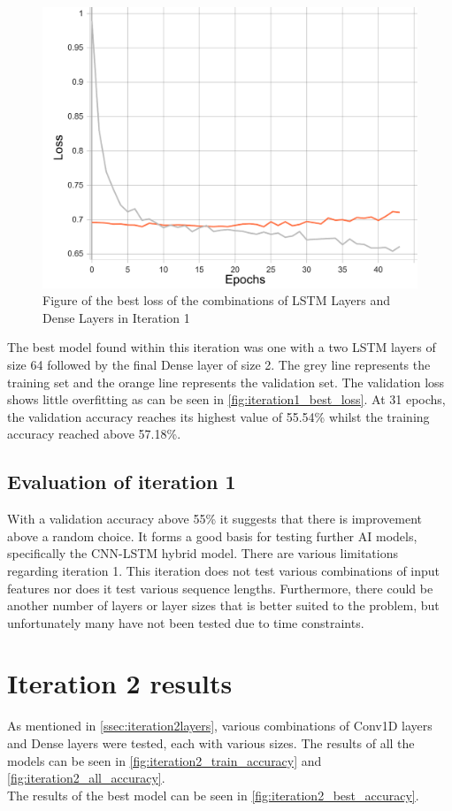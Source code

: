 \begin{figure}[ht]
    \centering
    \includegraphics[width=0.95\columnwidth]{figures/results/lstm/lstm_2L64-2D32_loss.pdf}
    \caption[Best loss for Iteration 1]{Figure of the best loss of the combinations of LSTM Layers and Dense Layers in Iteration 1}
    \label{fig:iteration1_best_loss}
\end{figure}
\FloatBarrier

The best model found within this iteration was one with a two LSTM layers of size 64 followed
by the final Dense layer of size 2. The grey line represents the training set and the orange line represents
the validation set. The validation loss shows little overfitting as can be seen in
\autoref{fig:iteration1_best_loss}. At 31 epochs, the validation accuracy reaches its highest value of
55.54\% whilst the training accuracy reached above 57.18\%.
\subsection{Evaluation of iteration 1}
With a validation accuracy above 55\% it suggests that there is improvement above a random choice. It forms a good
basis for testing further AI models, specifically the CNN-LSTM hybrid model.
There are various limitations regarding iteration 1. This iteration does not test various combinations of
input features nor does it test various sequence lengths. Furthermore, there could be another number of layers or
layer sizes that is better suited to the problem, but unfortunately many have not been tested due to time constraints.

\section{Iteration 2 results}
As mentioned in \autoref{ssec:iteration2layers}, various combinations of Conv1D layers and Dense layers were tested,
each with various sizes. The results of all the models can be seen in \autoref{fig:iteration2_train_accuracy}
and \autoref{fig:iteration2_all_accuracy}.\\
The results of the best model can be seen in \autoref{fig:iteration2_best_accuracy}.

